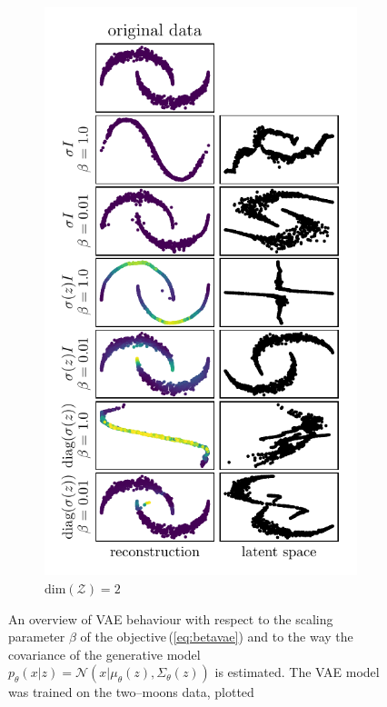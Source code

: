 \begin{figure}
\begin{subfigure}[b]{0.45\textwidth}
        \includegraphics[scale=0.9]{data/chapter_survey/vae_two_moons_z2_colored}
        \caption{$\text{dim}(\mathcal{Z})=2$}
    \end{subfigure}
\caption{An overview of VAE behaviour with respect to the scaling parameter
$\beta$ of the objective\,(\ref{eq:betavae}) and to the way the
covariance of the generative model $p_{\theta}(x|z)=\mathcal{N}(x|\mu_{\theta}(z),\Sigma_{\theta}(z))$
is estimated. The VAE model was trained on the two--moons data, plotted
}
\end{figure}

